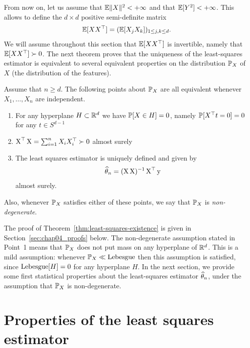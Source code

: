 From now on, let us assume that $\E \norm{X}^2 < +\infty$ and that $\E[Y^2] < +\infty$.
This allows to define the $d \times d$ positive semi-definite%
matrix
\begin{equation}
	\E[ X X^\top] = (\E [X_j X_k])_{1 \leq j, k \leq d}.
\end{equation}
We will assume throughout this section that $\E[ X X^\top]$ is invertible, namely that $\E[ X X^\top] \succ 0$.
The next theorem proves that the uniqueness of the least-squares estimator is equivalent to several equivalent properties on the distribution $\P_X$ of~$X$ (the distribution of the features).
\begin{theorem}
	\label{thm:least-squares-existence}
	Assume that $n \geq d$. The following points about $\P_X$ are all equivalent whenever $X_1, \ldots, X_n$ are independent.
	\begin{enumerate}
		\item For any hyperplane $H \subset \R^d$ we have $\P[X \in H] = 0$, namely $\P[X^\top t = 0] = 0$ for any $t \in S^{d-1}$
		\item $\bX^\top \bX = \sum_{i=1}^n X_i X_i^\top \succ 0$ almost surely
		\item The least squares estimator is uniquely defined and given by
		\begin{equation*}
			\wh \theta_n = (\bX \bX)^{-1} \bX^\top \by
		\end{equation*}
		almost surely.
	\end{enumerate}
	Also, whenever $\P_X$ satisfies either of these points, we say that $\P_X$ is \emph{non-degenerate}.
\end{theorem}

The proof of Theorem~\ref{thm:least-squares-existence} is given in Section~\ref{sec:chap04_proofs} below.
The non-degenerate assumption stated in Point~1 means that $\P_X$ does not put mass on any hyperplane of $\R^d$.
This is a mild assumption: whenever $\P_X \ll \leb$ then this assumption is satisfied, since $\leb[H] = 0$ for any hyperplane $H$.
In the next section, we provide some first statistical properties about the least-squares estimator $\wh \theta_n$, under the assumption that $\P_X$ is non-degenerate.

\section{Properties of the least squares estimator} %
\label{sec:some_properties_of_the_least_squares_estimator}

